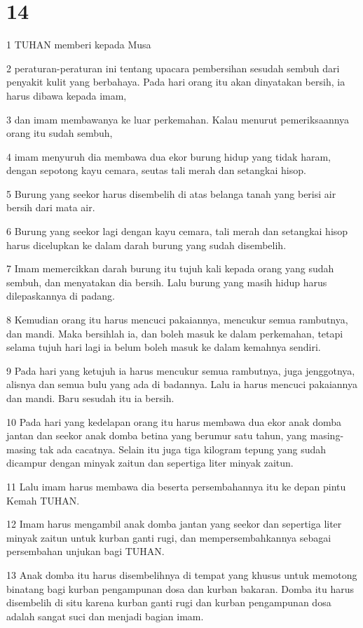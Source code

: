 \chapter{14}

\par 1 TUHAN memberi kepada Musa
\par 2 peraturan-peraturan ini tentang upacara pembersihan sesudah sembuh dari penyakit kulit yang berbahaya. Pada hari orang itu akan dinyatakan bersih, ia harus dibawa kepada imam,
\par 3 dan imam membawanya ke luar perkemahan. Kalau menurut pemeriksaannya orang itu sudah sembuh,
\par 4 imam menyuruh dia membawa dua ekor burung hidup yang tidak haram, dengan sepotong kayu cemara, seutas tali merah dan setangkai hisop.
\par 5 Burung yang seekor harus disembelih di atas belanga tanah yang berisi air bersih dari mata air.
\par 6 Burung yang seekor lagi dengan kayu cemara, tali merah dan setangkai hisop harus dicelupkan ke dalam darah burung yang sudah disembelih.
\par 7 Imam memercikkan darah burung itu tujuh kali kepada orang yang sudah sembuh, dan menyatakan dia bersih. Lalu burung yang masih hidup harus dilepaskannya di padang.
\par 8 Kemudian orang itu harus mencuci pakaiannya, mencukur semua rambutnya, dan mandi. Maka bersihlah ia, dan boleh masuk ke dalam perkemahan, tetapi selama tujuh hari lagi ia belum boleh masuk ke dalam kemahnya sendiri.
\par 9 Pada hari yang ketujuh ia harus mencukur semua rambutnya, juga jenggotnya, alisnya dan semua bulu yang ada di badannya. Lalu ia harus mencuci pakaiannya dan mandi. Baru sesudah itu ia bersih.
\par 10 Pada hari yang kedelapan orang itu harus membawa dua ekor anak domba jantan dan seekor anak domba betina yang berumur satu tahun, yang masing-masing tak ada cacatnya. Selain itu juga tiga kilogram tepung yang sudah dicampur dengan minyak zaitun dan sepertiga liter minyak zaitun.
\par 11 Lalu imam harus membawa dia beserta persembahannya itu ke depan pintu Kemah TUHAN.
\par 12 Imam harus mengambil anak domba jantan yang seekor dan sepertiga liter minyak zaitun untuk kurban ganti rugi, dan mempersembahkannya sebagai persembahan unjukan bagi TUHAN.
\par 13 Anak domba itu harus disembelihnya di tempat yang khusus untuk memotong binatang bagi kurban pengampunan dosa dan kurban bakaran. Domba itu harus disembelih di situ karena kurban ganti rugi dan kurban pengampunan dosa adalah sangat suci dan menjadi bagian imam.

